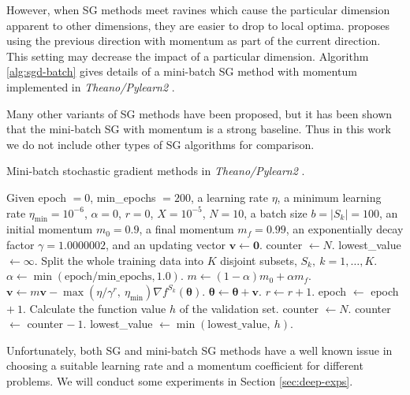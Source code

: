 \documentclass[12pt]{article}
\def\bv{{\boldsymbol v}}
\def\bzero{{\boldsymbol 0}}
\def\btheta{\boldsymbol \theta}
\renewcommand{\baselinestretch}{2}
\begin{document}
However, when SG methods meet ravines which cause the particular dimension apparent to other dimensions, they are easier to drop to local optima. 
\cite{BTP64} proposes using the previous direction with momentum as part of the current direction. This setting may decrease the impact of a particular dimension.
Algorithm \ref{alg:sgd-batch} gives details of a mini-batch SG method with momentum implemented in {\sl Theano/Pylearn2} \citep{IJG13a}.
\par Many other variants of SG methods have been proposed, but it has been shown \citep[e.g.,][]{IS13a} that the mini-batch SG with momentum is a strong baseline.
Thus in this work we do not include other types of SG algorithms for comparison.
\renewcommand{\baselinestretch}{1.3}
\begin{algorithm}[t]
  \caption{Mini-batch stochastic gradient methods in {\sl Theano/Pylearn2} \citep{IJG13a}.}
  \begin{algorithmic}[1]
    \State Given epoch $ = 0$, min\_epochs $ = 200$, a learning rate $\eta$, a minimum learning rate $\eta_{\min}=10^{-6}$, $\alpha=0$, $r=0$, $X=10^{-5}$, $N=10$, a batch size $b = |S_k| = 100$, an initial momentum $m_0=0.9$, a
  final momentum $m_f=0.99$, an exponentially decay factor $\gamma=1.0000002$, and an updating vector $\bv \leftarrow \bzero$.
  \State counter $\leftarrow N$.
  \State lowest\_value $\leftarrow \infty$.
  \State Split the whole training data into $K$ disjoint subsets, $S_k,\ k=1,\ldots,K$.
  \State $\alpha \leftarrow \min(\text{epoch}/\text{min\_epochs}, 1.0)$.
  \State $m \leftarrow (1-\alpha)m_0 + \alpha m_f$.
  \State $\bv \leftarrow m\bv - \max(\eta/\gamma^{r},\ \eta_{\min})\nabla f^{S_k}(\btheta)$. 
	\State $\btheta \leftarrow \btheta + \bv$.
    \State $r \leftarrow r+1$.
  \EndFor
  \State epoch $\leftarrow$ epoch $ +\ 1$.
  \State Calculate the function value $h$ of the validation set.
    \State counter $\leftarrow N$.
  \Else
    \State counter $\leftarrow$ counter $-\ 1$.
  \EndIf
  \State lowest\_value $\leftarrow \min(\text{lowest\_value},\ h)$.
  \EndWhile
  \end{algorithmic}
  \label{alg:sgd-batch}
\end{algorithm}
\renewcommand{\baselinestretch}{2}
\par Unfortunately, both SG and mini-batch SG methods have a well known issue in choosing a suitable learning rate and a momentum coefficient for different problems. We will conduct some experiments in Section \ref{sec:deep-exps}.
\end{document}
